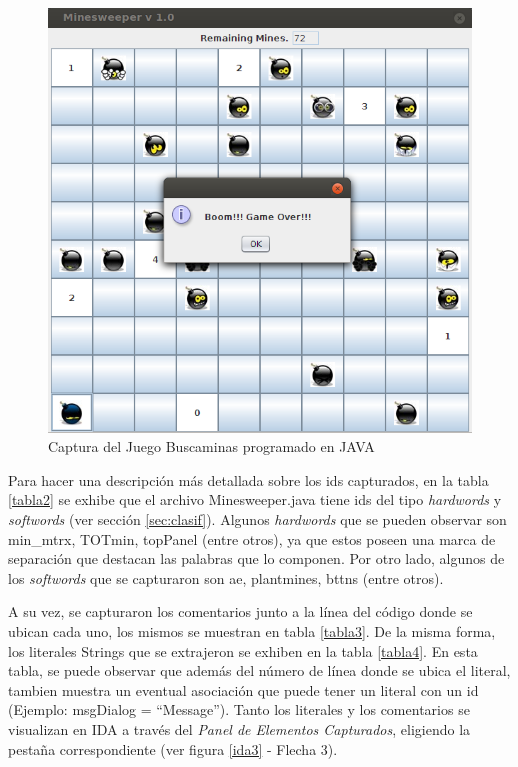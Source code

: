 \begin{figure}[t] %
\centerline{%
\includegraphics[scale= 0.5]{./cap4/caso_01.png}
}
\caption{Captura del Juego Buscaminas programado en JAVA}
\label{caso1}
\end{figure}


Para hacer una descripción más detallada sobre los ids capturados, en la tabla \ref{tabla2} se exhibe que el archivo \mbox{Minesweeper.java}
tiene ids del tipo \textit{hardwords} y \textit{softwords} (ver sección \ref{sec:clasif}). Algunos \textit{hardwords} que se pueden observar son \textsf{min\_mtrx}, \textsf{TOTmin}, \textsf{topPanel} (entre otros), ya que estos poseen una marca de separación que destacan las palabras que lo componen. Por otro lado, algunos de los \textit{softwords} que se capturaron son \textsf{ae}, \textsf{plantmines}, \textsf{bttns} (entre otros).

A su vez, se capturaron los comentarios junto a la línea del código donde se ubican cada uno, los mismos se muestran en tabla \ref{tabla3}. De la misma forma, los literales Strings que se extrajeron se exhiben en la tabla \ref{tabla4}. En esta tabla, se puede observar que además del número de línea donde se ubica el literal, tambien muestra un eventual asociación que puede tener un literal con un id (Ejemplo: \textsf{msgDialog} = “Message”). 
Tanto los literales y los comentarios se visualizan en IDA a través del \textit{Panel de Elementos Capturados}, eligiendo la pestaña correspondiente (ver figura \ref{ida3} - Flecha 3).

